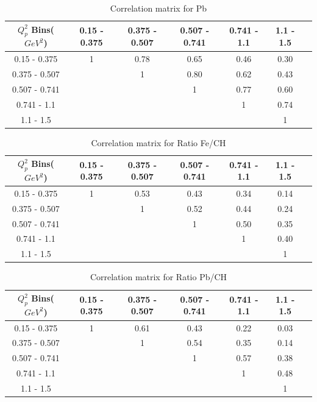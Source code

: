 \begin{table}[ht]
\begin{tabular}{c | c c c c c c | }
\hline
\hline
$Q^2_p$ Bins($GeV^2$)&0.15 - 0.375&0.375 - 0.507&0.507 - 0.741&0.741 - 1.1&1.1 - 1.5\\
\hline
0.15 - 0.375 & 1 & 0.78 & 0.65 & 0.46 & 0.30\\
0.375 - 0.507 & & 1 & 0.80 & 0.62 & 0.43 \\
0.507 - 0.741 & & & 1 & 0.77 & 0.60 \\
0.741 - 1.1 & & & &  1 & 0.74 \\
1.1 - 1.5 & & & & &  1  \\
\hline
\hline
\end{tabular}
\caption{Correlation matrix for Pb}
\end{table}

\begin{table}[ht]
\begin{tabular}{c | c c c c c c | }
\hline
\hline
$Q^2_p$ Bins($GeV^2$)&0.15 - 0.375&0.375 - 0.507&0.507 - 0.741&0.741 - 1.1&1.1 - 1.5\\
\hline
0.15 - 0.375 & 1 & 0.53 & 0.43 & 0.34 & 0.14\\
0.375 - 0.507 & & 1 & 0.52 & 0.44 & 0.24 \\
0.507 - 0.741 & & & 1 & 0.50 & 0.35 \\
0.741 - 1.1 & & & &  1 & 0.40 \\
1.1 - 1.5 & & & & &  1  \\
\hline
\hline
\end{tabular}
\caption{Correlation matrix for Ratio Fe/CH  }
\end{table}
\newpage
\begin{table}[ht]
\begin{tabular}{c | c c c c c c|  }
\hline
\hline
$Q^2_p$ Bins($GeV^2$)&0.15 - 0.375&0.375 - 0.507&0.507 - 0.741&0.741 - 1.1&1.1 - 1.5\\
\hline
0.15 - 0.375 & 1 & 0.61 & 0.43 & 0.22 & 0.03\\
0.375 - 0.507 & & 1 & 0.54 & 0.35 & 0.14 \\
0.507 - 0.741 & & & 1 & 0.57 & 0.38 \\
0.741 - 1.1 & & & &  1 & 0.48 \\
1.1 - 1.5 & & & & &  1  \\
\hline
\hline
\end{tabular}
\caption{Correlation matrix for Ratio Pb/CH  }
\end{table}

